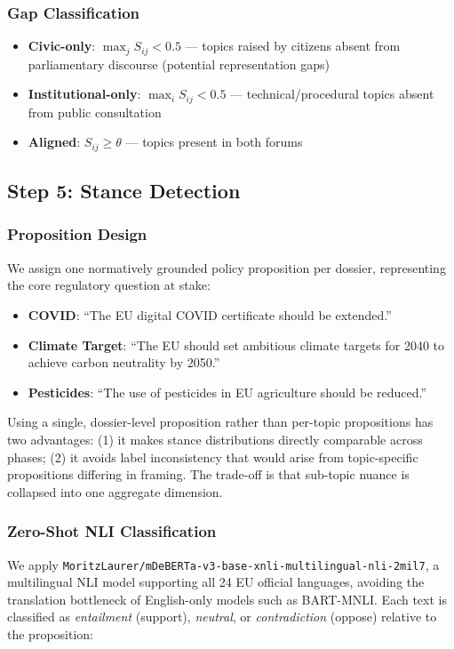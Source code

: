 \documentclass[sigconf,natbib]{acmart}
\begin{document}
\subsubsection{Gap Classification}
\begin{itemize}
  \item \textbf{Civic-only}: $\max_j S_{ij} < 0.5$ — topics raised by citizens absent from
        parliamentary discourse (potential representation gaps)
  \item \textbf{Institutional-only}: $\max_i S_{ij} < 0.5$ — technical/procedural topics
        absent from public consultation
  \item \textbf{Aligned}: $S_{ij} \geq \theta$ — topics present in both forums
\end{itemize}

\subsection{Step 5: Stance Detection}

\subsubsection{Proposition Design}
We assign one normatively grounded policy proposition per dossier, representing the core
regulatory question at stake:

\begin{itemize}
  \item \textbf{COVID}: ``The EU digital COVID certificate should be extended.''
  \item \textbf{Climate Target}: ``The EU should set ambitious climate targets for 2040 to achieve carbon neutrality by 2050.''
  \item \textbf{Pesticides}: ``The use of pesticides in EU agriculture should be reduced.''
\end{itemize}

Using a single, dossier-level proposition rather than per-topic propositions has two
advantages: (1) it makes stance distributions directly comparable across phases; (2) it
avoids label inconsistency that would arise from topic-specific propositions differing
in framing. The trade-off is that sub-topic nuance is collapsed into one aggregate dimension.

\subsubsection{Zero-Shot NLI Classification}
We apply \texttt{MoritzLaurer/mDeBERTa-v3-base-xnli-multilingual-nli-2mil7}, a multilingual
NLI model supporting all 24 EU official languages, avoiding the translation bottleneck of
English-only models such as BART-MNLI. Each text is classified as \textit{entailment}
(support), \textit{neutral}, or \textit{contradiction} (oppose) relative to the proposition:
\end{document}
